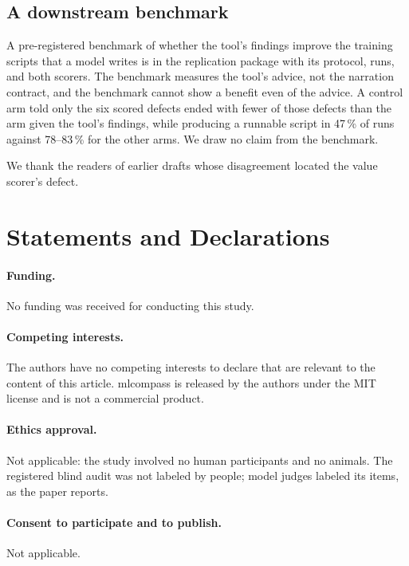 \documentclass[smallextended,natbib]{svjour3}
\begin{document}
\subsection{A downstream benchmark}\label{app:benchmark}
A pre-registered benchmark of whether the tool's findings improve the training
scripts that a model writes is in the replication package with its protocol,
runs, and both scorers. The benchmark measures the tool's advice, not the
narration contract, and the benchmark cannot show a benefit even of the
advice. A control arm told only the six scored defects ended with fewer of
those defects than the arm given the tool's findings, while producing a
runnable script in 47\,\% of runs against 78--83\,\% for the other arms. We draw no claim from
the benchmark.

\begin{acknowledgements}
We thank the readers of earlier drafts whose disagreement located the value
scorer's defect.
\end{acknowledgements}

\section*{Statements and Declarations}

\paragraph{Funding.} No funding was received for conducting this study.

\paragraph{Competing interests.} The authors have no competing interests to
declare that are relevant to the content of this article. mlcompass is released
by the authors under the MIT license and is not a commercial product.

\paragraph{Ethics approval.} Not applicable: the study involved no human
participants and no animals. The registered blind audit was not labeled by
people; model judges labeled its items, as the paper reports.

\paragraph{Consent to participate and to publish.} Not applicable.
\end{document}

